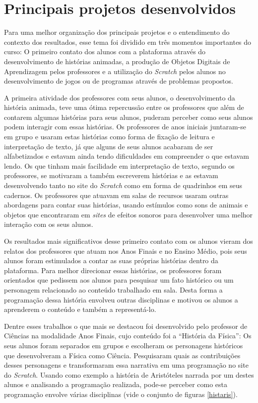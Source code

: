 \documentclass[12pt, openright, a4paper, brazil, english, french, spanish, bibjustif, openany, oneside]{abntex2}
\begin{document}
\section{Principais projetos desenvolvidos}

Para uma melhor organização dos principais projetos e o entendimento do contexto dos resultados, esse tema foi dividido em três momentos importantes do curso: O primeiro contato dos alunos com a plataforma através do desenvolvimento de histórias animadas, a produção de Objetos Digitais de Aprendizagem pelos professores e a utilização do \textit{Scratch} pelos alunos no desenvolvimento de jogos ou de programas através de problemas propostos.

A primeira atividade dos professores com seus alunos, o desenvolvimento da história animada, teve uma ótima repercussão entre os professores que além de contarem algumas histórias para seus alunos, puderam perceber como seus alunos podem interagir com essas histórias. Os professores de anos iniciais juntaram-se em grupo e usaram estas histórias como forma de fixação de leitura e interpretação de texto, já que alguns de seus alunos acabaram de ser alfabetizados e estavam ainda tendo dificuldades em compreender o que estavam lendo. Os que tinham mais facilidade em interpretação de texto, segundo os professores, se motivaram a também escreverem histórias e as estavam desenvolvendo tanto no site do \textit{Scratch} como em forma de quadrinhos em seus cadernos. Os professores que atuavam em salas de recursos usaram outras abordagens para contar suas histórias, usando estímulos como sons de animais e objetos que encontraram em \textit{sites} de efeitos sonoros para desenvolver uma melhor interação com os seus alunos.

Os resultados mais significativos desse primeiro contato com os alunos vieram dos relatos dos professores que atuam nos Anos Finais e no Ensino Médio, pois seus alunos foram estimulados a contar as suas próprias histórias dentro da plataforma. Para melhor direcionar essas histórias, os professores foram orientados que pedissem aos alunos para pesquisar um fato histórico ou um personagem relacionado ao conteúdo trabalhado em sala. Desta forma a programação dessa história envolveu outras disciplinas e motivou os alunos a aprenderem o conteúdo e também a representá-lo. 

Dentre esses trabalhos o que mais se destacou foi desenvolvido pelo professor de Ciências na modalidade Anos Finais, cujo conteúdo foi a ``História da Física'': Os seus alunos foram separados em grupos e escolheram os personagens históricos que desenvolveram a Física como Ciência. Pesquisaram quais as contribuições desses personagens e transformaram essa narrativa em uma programação no site do \textit{Scratch}. Usando como exemplo a história de Aristóteles narrada por um destes alunos e analisando a programação realizada, pode-se perceber como esta programação envolve várias disciplinas (vide o conjunto de figuras \ref{histaris}).
\end{document}
